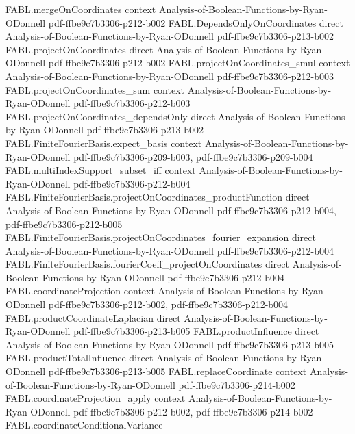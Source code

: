 \begin{theorem}
  {FABL.mergeOnCoordinates}
  {context}
  {Analysis-of-Boolean-Functions-by-Ryan-ODonnell}
  {pdf-ffbe9c7b3306-p212-b002}
\proofstep
  {FABL.DependsOnlyOnCoordinates}
  {direct}
  {Analysis-of-Boolean-Functions-by-Ryan-ODonnell}
  {pdf-ffbe9c7b3306-p213-b002}
\proofstep
  {FABL.projectOnCoordinates}
  {direct}
  {Analysis-of-Boolean-Functions-by-Ryan-ODonnell}
  {pdf-ffbe9c7b3306-p212-b002}
\proofstep
  {FABL.projectOnCoordinates_smul}
  {context}
  {Analysis-of-Boolean-Functions-by-Ryan-ODonnell}
  {pdf-ffbe9c7b3306-p212-b003}
\proofstep
  {FABL.projectOnCoordinates_sum}
  {context}
  {Analysis-of-Boolean-Functions-by-Ryan-ODonnell}
  {pdf-ffbe9c7b3306-p212-b003}
\proofstep
  {FABL.projectOnCoordinates_dependsOnly}
  {direct}
  {Analysis-of-Boolean-Functions-by-Ryan-ODonnell}
  {pdf-ffbe9c7b3306-p213-b002}
\proofstep
  {FABL.FiniteFourierBasis.expect_basis}
  {context}
  {Analysis-of-Boolean-Functions-by-Ryan-ODonnell}
  {pdf-ffbe9c7b3306-p209-b003,
    pdf-ffbe9c7b3306-p209-b004}
\proofstep
  {FABL.multiIndexSupport_subset_iff}
  {context}
  {Analysis-of-Boolean-Functions-by-Ryan-ODonnell}
  {pdf-ffbe9c7b3306-p212-b004}
\proofstep
  {FABL.FiniteFourierBasis.projectOnCoordinates_productFunction}
  {direct}
  {Analysis-of-Boolean-Functions-by-Ryan-ODonnell}
  {pdf-ffbe9c7b3306-p212-b004,
    pdf-ffbe9c7b3306-p212-b005}
\proofstep
  {FABL.FiniteFourierBasis.projectOnCoordinates_fourier_expansion}
  {direct}
  {Analysis-of-Boolean-Functions-by-Ryan-ODonnell}
  {pdf-ffbe9c7b3306-p212-b004}
\proofstep
  {FABL.FiniteFourierBasis.fourierCoeff_projectOnCoordinates}
  {direct}
  {Analysis-of-Boolean-Functions-by-Ryan-ODonnell}
  {pdf-ffbe9c7b3306-p212-b004}
\proofstep
  {FABL.coordinateProjection}
  {context}
  {Analysis-of-Boolean-Functions-by-Ryan-ODonnell}
  {pdf-ffbe9c7b3306-p212-b002,
    pdf-ffbe9c7b3306-p212-b004}
\proofstep
  {FABL.productCoordinateLaplacian}
  {direct}
  {Analysis-of-Boolean-Functions-by-Ryan-ODonnell}
  {pdf-ffbe9c7b3306-p213-b005}
\proofstep
  {FABL.productInfluence}
  {direct}
  {Analysis-of-Boolean-Functions-by-Ryan-ODonnell}
  {pdf-ffbe9c7b3306-p213-b005}
\proofstep
  {FABL.productTotalInfluence}
  {direct}
  {Analysis-of-Boolean-Functions-by-Ryan-ODonnell}
  {pdf-ffbe9c7b3306-p213-b005}
\proofstep
  {FABL.replaceCoordinate}
  {context}
  {Analysis-of-Boolean-Functions-by-Ryan-ODonnell}
  {pdf-ffbe9c7b3306-p214-b002}
\proofstep
  {FABL.coordinateProjection_apply}
  {context}
  {Analysis-of-Boolean-Functions-by-Ryan-ODonnell}
  {pdf-ffbe9c7b3306-p212-b002,
    pdf-ffbe9c7b3306-p214-b002}
\proofstep
  {FABL.coordinateConditionalVariance}

\end{theorem}
